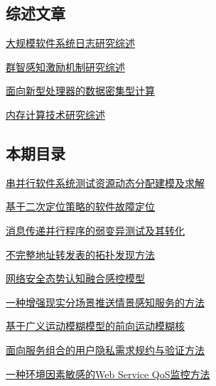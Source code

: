 \documentclass[a4paper]{article}
\begin{document}
\subsection{综述文章}
\href{http://www.jos.org.cn/ch/reader/download_pdf.aspx?file_no=4936&year_id=2016&quarter_id=8&falg=1}{大规模软件系统日志研究综述}

\href{http://www.jos.org.cn/ch/reader/download_pdf.aspx?file_no=5049&year_id=2016&quarter_id=8&falg=1}{群智感知激励机制研究综述}

\href{http://www.jos.org.cn/ch/reader/download_pdf.aspx?file_no=5060&year_id=2016&quarter_id=8&falg=1}{面向新型处理器的数据密集型计算}

\href{http://www.jos.org.cn/ch/reader/download_pdf.aspx?file_no=5103&year_id=2016&quarter_id=8&falg=1}{内存计算技术研究综述}

\subsection{本期目录}
\href{http://www.jos.org.cn/ch/reader/download_pdf.aspx?file_no=4845&year_id=2016&quarter_id=8&falg=1}{串并行软件系统测试资源动态分配建模及求解}

\href{http://www.jos.org.cn/ch/reader/download_pdf.aspx?file_no=4858&year_id=2016&quarter_id=8&falg=1}{基于二次定位策略的软件故障定位}

\href{http://www.jos.org.cn/ch/reader/download_pdf.aspx?file_no=4844&year_id=2016&quarter_id=8&falg=1}{消息传递并行程序的弱变异测试及其转化}

\href{http://www.jos.org.cn/ch/reader/download_pdf.aspx?file_no=4835&year_id=2016&quarter_id=8&falg=1}{不完整地址转发表的拓扑发现方法}

\href{http://www.jos.org.cn/ch/reader/download_pdf.aspx?file_no=4852&year_id=2016&quarter_id=8&falg=1}{网络安全态势认知融合感控模型}

\href{http://www.jos.org.cn/ch/reader/download_pdf.aspx?file_no=4846&year_id=2016&quarter_id=8&falg=1}{一种增强现实分场景推送情景感知服务的方法}

\href{http://www.jos.org.cn/ch/reader/download_pdf.aspx?file_no=4864&year_id=2016&quarter_id=8&falg=1}{基于广义运动模糊模型的前向运动模糊核}

\href{http://www.jos.org.cn/ch/reader/download_pdf.aspx?file_no=4945&year_id=2016&quarter_id=8&falg=1}{面向服务组合的用户隐私需求规约与验证方法}

\href{http://www.jos.org.cn/ch/reader/download_pdf.aspx?file_no=4850&year_id=2016&quarter_id=8&falg=1}{一种环境因素敏感的Web Service QoS监控方法}
\end{document}
